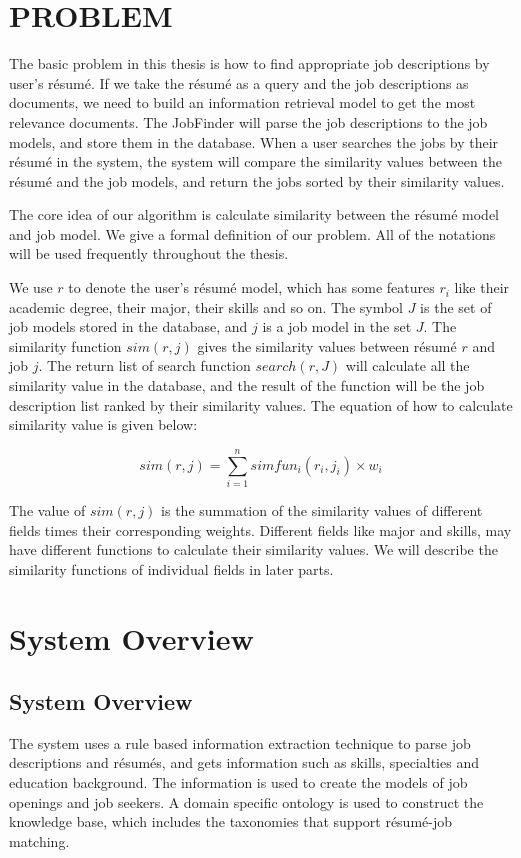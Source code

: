 \chapter{PROBLEM}

The basic problem in this thesis is how to find appropriate job descriptions by user's r\'esum\'e. If we take the r\'esum\'e as a query and the job descriptions as documents, we need to build an information retrieval model to get the most relevance documents.  The JobFinder will parse the job descriptions to the job models, and store them in the database. When a user searches the jobs by their r\'esum\'e in the system, the system will compare the similarity values between the r\'esum\'e and the job models, and return the jobs sorted by their similarity values.

The core idea of our algorithm is calculate similarity between the r\'esum\'e model and job model.
We give a formal definition of our problem. All of the notations will be used frequently throughout the thesis.

We use $r$ to denote the user's r\'esum\'e model, which has some features $r_i$ like their academic degree, their major, their skills and so on. The symbol $J$ is the set of job models stored in the database, and $j$ is a job model in the set $J$. The similarity function $sim(r, j)$ gives the similarity values between r\'esum\'e $r$ and job $j$. The return list of search function $search(r,J)$ will calculate all the similarity value in the database, and the result of the function will be the job description list ranked by their similarity values. The equation of how to calculate similarity value is given below:

$$ sim(r, j) = \sum_{i=1}^{n} simfun_i(r_i,j_i) \times w_i $$

The value of $sim(r, j)$ is the summation of the similarity values of different fields times their corresponding weights. Different fields like major and skills,  may have different functions to calculate their similarity values. We will describe the similarity functions of individual fields in later parts.

\chapter{System Overview}

\section{System Overview}
The system uses a rule based information extraction technique to parse job descriptions and r\'esum\'es, and gets information such as skills, specialties and education background. The information is used to create the models of job openings and job seekers. A domain specific ontology is used to construct the knowledge base, which includes the taxonomies that support r\'esum\'e-job matching.

